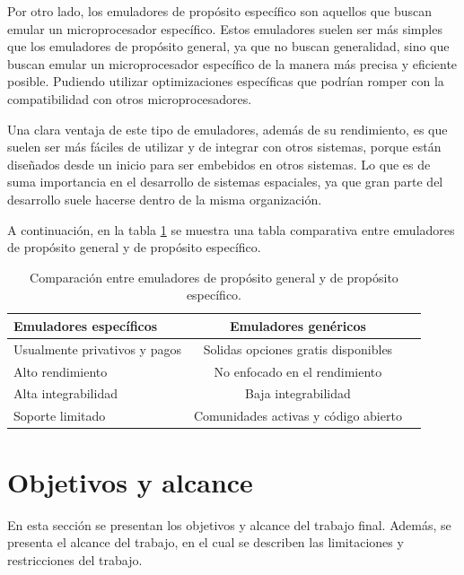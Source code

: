 Por otro lado, los emuladores de propósito específico son aquellos que buscan emular un microprocesador específico. Estos emuladores suelen ser más simples que los emuladores de propósito general, ya que no buscan generalidad, sino que buscan emular un microprocesador específico de la manera más precisa y eficiente posible. Pudiendo utilizar optimizaciones específicas que podrían romper con la compatibilidad con otros microprocesadores.

Una clara ventaja de este tipo de emuladores, además de su rendimiento, es que suelen ser más fáciles de utilizar y de integrar con otros sistemas, porque están diseñados desde un inicio para ser embebidos en otros sistemas. Lo que es de suma importancia en el desarrollo de sistemas espaciales, ya que gran parte del desarrollo suele hacerse dentro de la misma organización.

A continuación, en la tabla \ref{tab:comparacion_emuladores} se muestra una tabla comparativa entre emuladores de propósito general y de propósito específico.

\begin{table}[h]
	\centering
	\caption[Tipos de emuladores]{Comparación entre emuladores de propósito general y de propósito específico.}
	\begin{tabular}{l c c}
		\toprule
		\textbf{Emuladores específicos} & \textbf{Emuladores genéricos} \\
		\midrule
		Usualmente privativos y pagos & Solidas opciones gratis disponibles	\\
		Alto rendimiento	 & No enfocado en el rendimiento  \\
		Alta integrabilidad	 & Baja integrabilidad	 \\
		Soporte limitado & Comunidades activas y código abierto	 \\
		\bottomrule
		\hline
	\end{tabular}
	\label{tab:comparacion_emuladores}
\end{table}



\section{Objetivos y alcance}
\label{sec:objetivos_alcance}

En esta sección se presentan los objetivos y alcance del trabajo final. Además, se presenta el alcance del trabajo, en el cual se describen las limitaciones y restricciones del trabajo.


